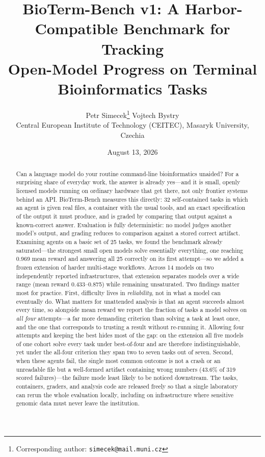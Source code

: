 \documentclass[11pt]{article}
\title{BioTerm-Bench v1: A Harbor-Compatible Benchmark for Tracking\\Open-Model Progress on Terminal Bioinformatics Tasks}
\author{
Petr Simecek\thanks{Corresponding author: \texttt{simecek@mail.muni.cz}} \quad Vojtech Bystry\\[0.5em]
\normalsize Central European Institute of Technology (CEITEC), Masaryk University, Czechia
}
\date{August 13, 2026}
\begin{document}
\sloppy
\maketitle

\begin{abstract}
Can a language model do your routine command-line bioinformatics unaided?
For a surprising share of everyday work, the answer is already yes---and it is small, openly licensed models running on ordinary hardware that get there, not only frontier systems behind an API.
BioTerm-Bench measures this directly: 32 self-contained tasks in which an agent is given real files, a container with the usual tools, and an exact specification of the output it must produce, and is graded by comparing that output against a known-correct answer.
Evaluation is fully deterministic: no model judges another model's output, and grading reduces to comparison against a stored correct artifact.
Examining agents on a basic set of 25 tasks, we found the benchmark already saturated---the strongest small open models solve essentially everything, one reaching 0.969 mean reward and answering all 25 correctly on its first attempt---so we added a frozen extension of harder multi-stage workflows.
Across 14 models on two independently reported infrastructures, that extension separates models over a wide range (mean reward 0.433--0.875) while remaining unsaturated.
Two findings matter most for practice.
First, difficulty lives in \emph{reliability}, not in what a model can eventually do.
What matters for unattended analysis is that an agent succeeds almost every time, so alongside mean reward we report the fraction of tasks a model solves on \emph{all four} attempts---a far more demanding criterion than solving a task at least once, and the one that corresponds to trusting a result without re-running it.
Allowing four attempts and keeping the best hides most of the gap: on the extension all five models of one cohort solve every task under best-of-four and are therefore indistinguishable, yet under the all-four criterion they span two to seven tasks out of seven.
Second, when these agents fail, the single most common outcome is not a crash or an unreadable file but a well-formed artifact containing wrong numbers (43.6\% of 319 scored failures)---the failure mode least likely to be noticed downstream.
The tasks, containers, graders, and analysis code are released freely so that a single laboratory can rerun the whole evaluation locally, including on infrastructure where sensitive genomic data must never leave the institution.
\end{abstract}
\end{document}
